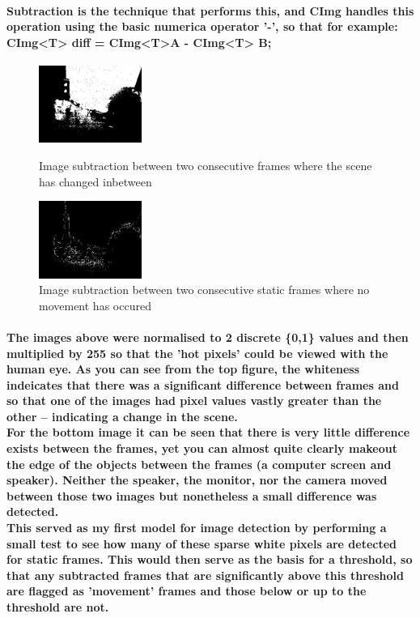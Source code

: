 \documentclass[11pt]{article} %
\begin{document}
\paragraph{Subtraction is the technique that performs this, and CImg handles this operation using the basic numerica operator '-', so that for example: CImg<T> diff = CImg<T>A - CImg<T> B;
}
\begin{figure}
	\vspace{-20pt}
	\begin{center}
		\includegraphics[width=0.3\textwidth]{../images/subG}
	\end{center}
	\vspace{-20pt}
	\caption{Image subtraction between two consecutive frames where the scene has changed inbetween}
	\vspace{10pt}
	\begin{center}
		\includegraphics[width=0.3\textwidth]{../images/subF}
	\end{center}
	\vspace{-20pt}
	\caption{Image subtraction between two consecutive static frames where no movement has occured}
\end{figure}
\paragraph{The images above were normalised to 2 discrete \{0,1\} values and then multiplied by 255 so that the 'hot pixels' could be viewed with the human eye. As you can see from the top figure, the whiteness indeicates that there was a significant difference between frames and so that one of the images had pixel values vastly greater than the other -- indicating a change in the scene.
\\For the bottom image it can be seen that there is very little difference exists between the frames, yet you can almost quite clearly makeout the edge of the objects between the frames (a computer screen and speaker). Neither the speaker, the monitor, nor the camera moved between those two images but nonetheless a small difference was detected.\\
This served as my first model for image detection by performing a small test to see how many of these sparse white pixels are detected for static frames. This would then serve as the basis for a threshold, so that any subtracted frames that are significantly above this threshold are flagged as 'movement' frames and those below or up to the threshold 
are not.}
\pagebreak
\end{document}

